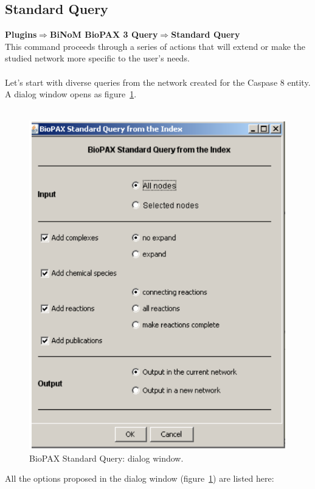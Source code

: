 \subsection{Standard Query}
\textbf{Plugins$\Rightarrow$BiNoM BioPAX 3 Query$\Rightarrow$Standard Query}\\
This command proceeds through a series of actions that will extend or make the studied network more specific to the user’s needs.\\\\
Let’s start with diverse queries from the network created for the Caspase 8 entity. A dialog window opens as figure~\ref{Standard_Query_Dialog}.\\\\
\begin{figure}[h]
\centering
\includegraphics{graphics/Standard_Query_Dialog}
\caption{BioPAX Standard Query: dialog window.}
\label{Standard_Query_Dialog}
\end{figure}
All the options proposed in the dialog window (figure~\ref{Standard_Query_Dialog}) are listed here:
